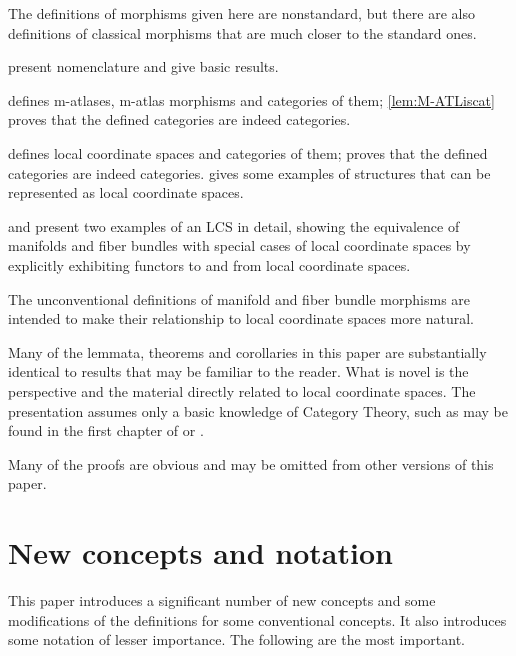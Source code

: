 \documentclass{article}
\begin{document}
\begin{remark}
The definitions of morphisms given here are nonstandard, but there are
also definitions of classical morphisms that are much closer to the
standard ones.
\end{remark}

 present nomenclature and give basic
results.

 defines m-atlases, m-atlas morphisms and categories
of them;
{
  \showlabelsinline
  \cref{lem:M-ATLiscat}
}
proves that the defined categories are indeed categories.

 defines local coordinate spaces and
categories of them;  proves that the defined
categories are indeed categories.
 gives some examples of structures that can be
represented as local coordinate spaces.

 and
 present two examples of an LCS in detail, showing
the equivalence of manifolds and fiber bundles with special cases of
local coordinate spaces by explicitly exhibiting functors to and from
local coordinate spaces.
\begin{remark}
The unconventional definitions of manifold and fiber bundle morphisms
are intended to make their relationship to local coordinate spaces more
natural.
\end{remark}

Many of the lemmata, theorems and corollaries in this paper are
substantially identical to results that may be familiar to the reader.
What is novel is the perspective and the material directly related to
local coordinate spaces. The presentation assumes only a basic knowledge
of Category Theory, such as may be found in the first chapter of
\cite{CftWM} or {
  \showlabelsinline
  \cite{JoyCat}.
}

Many of the proofs are obvious and may be omitted from other versions of
this paper.

\section{New concepts and notation}
\label{sec:new}
This paper introduces a significant number of new concepts and some
modifications of the definitions for some conventional concepts. It also
introduces some notation of lesser importance.  The following are the
most important.
\end{document}
